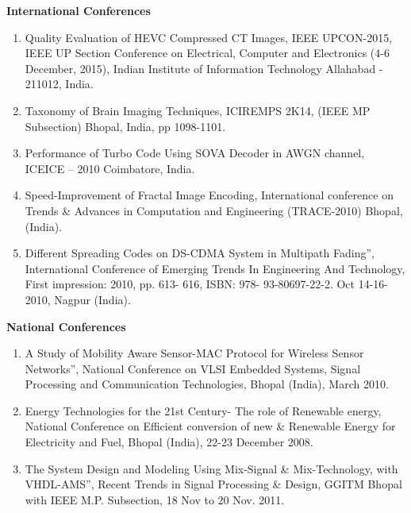\textbf{{International Conferences}}
\begin{enumerate}
	\item Quality Evaluation of HEVC Compressed CT Images, IEEE UPCON-2015, IEEE UP Section Conference on Electrical, Computer and Electronics (4-6 December, 2015), Indian Institute of Information Technology Allahabad - 211012, India.
	
	\item Taxonomy of Brain Imaging Techniques, ICIREMPS 2K14, (IEEE MP Subsection) Bhopal, India, pp 1098-1101.
	
	\item Performance of Turbo Code Using SOVA Decoder in AWGN channel, ICEICE – 2010 Coimbatore, India.
	
	\item Speed-Improvement of Fractal Image Encoding, International conference on Trends \& Advances in Computation and Engineering (TRACE-2010) Bhopal, (India).
	
	\item Different Spreading Codes on DS-CDMA System in Multipath Fading”, International Conference of Emerging Trends In Engineering And Technology, First impression: 2010, pp. 613- 616, ISBN: 978- 93-80697-22-2. Oct 14-16-2010, Nagpur (India).
	
\end{enumerate}

\textbf{{National Conferences}}
\begin{enumerate}
	\item A Study of Mobility Aware Sensor-MAC Protocol for Wireless Sensor Networks”, National Conference on VLSI Embedded Systems, Signal Processing and Communication Technologies, Bhopal (India), March 2010.
	
	\item Energy Technologies for the 21st Century- The role of Renewable energy, National Conference on Efficient conversion of new \& Renewable Energy for Electricity and Fuel, Bhopal (India), 22-23 December 2008.
	
	\item The System Design and Modeling Using Mix-Signal \& Mix-Technology, with VHDL-AMS”, Recent Trends in Signal Processing \& Design, GGITM Bhopal with IEEE M.P. Subsection, 18 Nov to 20 Nov. 2011.

\end{enumerate}